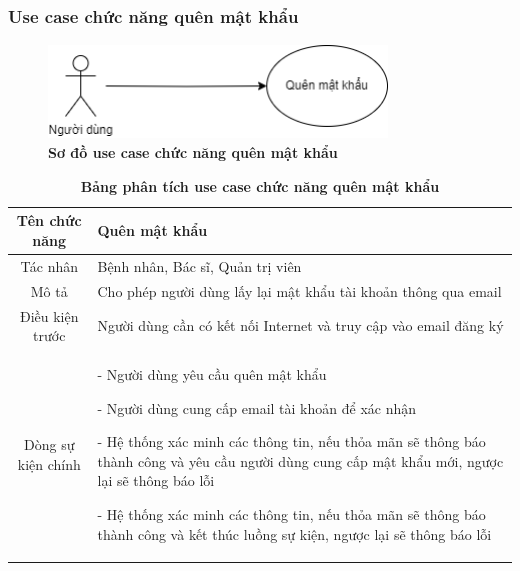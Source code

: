\subsubsection{Use case chức năng quên mật khẩu}
  \begin{figure}[H]
    \centering
    \includegraphics[width=9cm,height=2.5cm]{Images/use_case/use_case_forgot_password.png}
    \caption[Sơ đồ use case chức năng quên mật khẩu]{\bfseries \fontsize{12pt}{0pt}
    \selectfont Sơ đồ use case chức năng quên mật khẩu}
    \label{use_case_forget_password} %
  \end{figure}

  \begin{table}[H]
    \caption{\bfseries \fontsize{12pt}{0pt}\selectfont Bảng phân tích use case chức năng quên mật khẩu}
    \centering
    \begin{tabularx}{0.9\textwidth}{|c|X|}
      \hline
      \textbf{Tên chức năng} & \textbf{Quên mật khẩu} \\
      \hline
      Tác nhân & Bệnh nhân, Bác sĩ, Quản trị viên \\
      \hline
      Mô tả & Cho phép người dùng lấy lại mật khẩu tài khoản thông qua email
       \\
      \hline
      Điều kiện trước & Người dùng cần có kết nối Internet và truy cập vào email đăng ký \\
      \hline
      Dòng sự kiện chính & 
        - Người dùng yêu cầu quên mật khẩu

        - Người dùng cung cấp email tài khoản để xác nhận

        - Hệ thống xác minh các thông tin, nếu thỏa mãn sẽ thông báo thành công và yêu cầu người dùng cung cấp mật khẩu mới, ngược lại 
        sẽ thông báo lỗi 


        - Hệ thống xác minh các thông tin, nếu thỏa mãn sẽ thông báo thành công và kết thúc luồng sự kiện, ngược lại 
        sẽ thông báo lỗi 
        \\
      \hline
    \end{tabularx}
  \end{table}

